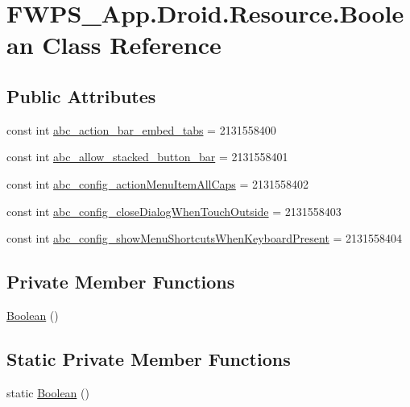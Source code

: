 \hypertarget{class_f_w_p_s___app_1_1_droid_1_1_resource_1_1_boolean}{}\section{F\+W\+P\+S\+\_\+\+App.\+Droid.\+Resource.\+Boolean Class Reference}
\label{class_f_w_p_s___app_1_1_droid_1_1_resource_1_1_boolean}
\subsection*{Public Attributes}
\begin{DoxyCompactItemize}
\item 
const int \mbox{\hyperlink{class_f_w_p_s___app_1_1_droid_1_1_resource_1_1_boolean_a18780bcd783feca22912193d53ef575d}{abc\+\_\+action\+\_\+bar\+\_\+embed\+\_\+tabs}} = 2131558400
\item 
const int \mbox{\hyperlink{class_f_w_p_s___app_1_1_droid_1_1_resource_1_1_boolean_a563c512f0e6a1d53ff702b9078816dab}{abc\+\_\+allow\+\_\+stacked\+\_\+button\+\_\+bar}} = 2131558401
\item 
const int \mbox{\hyperlink{class_f_w_p_s___app_1_1_droid_1_1_resource_1_1_boolean_a32b661cd08b644f249fefd40219fd574}{abc\+\_\+config\+\_\+action\+Menu\+Item\+All\+Caps}} = 2131558402
\item 
const int \mbox{\hyperlink{class_f_w_p_s___app_1_1_droid_1_1_resource_1_1_boolean_a36c7deb1802120c8ea455465226635f3}{abc\+\_\+config\+\_\+close\+Dialog\+When\+Touch\+Outside}} = 2131558403
\item 
const int \mbox{\hyperlink{class_f_w_p_s___app_1_1_droid_1_1_resource_1_1_boolean_abc20ea7f1566fc4263c2db30fe0e7a38}{abc\+\_\+config\+\_\+show\+Menu\+Shortcuts\+When\+Keyboard\+Present}} = 2131558404
\end{DoxyCompactItemize}
\subsection*{Private Member Functions}
\begin{DoxyCompactItemize}
\item 
\mbox{\hyperlink{class_f_w_p_s___app_1_1_droid_1_1_resource_1_1_boolean_a67bb47854f9f12bc6ae198011abd4b0d}{Boolean}} ()
\end{DoxyCompactItemize}
\subsection*{Static Private Member Functions}
\begin{DoxyCompactItemize}
\item 
static \mbox{\hyperlink{class_f_w_p_s___app_1_1_droid_1_1_resource_1_1_boolean_a6e36f29288ae2ed1343686f9eec97fee}{Boolean}} ()
\end{DoxyCompactItemize}


